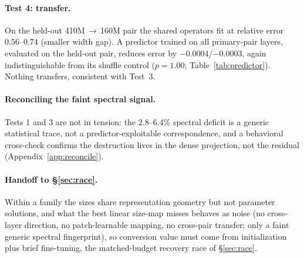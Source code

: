 \paragraph{Test 4: transfer.}
On the held-out 410M$\,\to\,$160M pair the shared operators fit at relative error
$0.56$--$0.74$ (smaller width gap). A predictor trained on all primary-pair
layers, evaluated on the held-out pair, reduces error by $-0.0004$/$-0.0003$,
again indistinguishable from its shuffle control ($p=1.00$;
Table~\ref{tab:predictor}). Nothing transfers, consistent with Test~3.

\paragraph{Reconciling the faint spectral signal.}
Tests 1 and 3 are not in tension: the $2.8$--$6.4\%$ spectral deficit is a
generic statistical trace, not a predictor-exploitable correspondence, and
a behavioral cross-check confirms the destruction lives in the dense projection,
not the residual (Appendix~\ref{app:reconcile}).

\paragraph{Handoff to \S\ref{sec:race}.}
Within a family the sizes share representation geometry but not parameter
solutions, and what the best linear size-map misses behaves as noise (no
cross-layer direction, no patch-learnable mapping, no cross-pair transfer; only a
faint generic spectral fingerprint), so conversion value must come from
initialization plus brief fine-tuning, the matched-budget recovery race
of \S\ref{sec:race}.

\ificlrcompact\else\TabPredictor\fi  %
